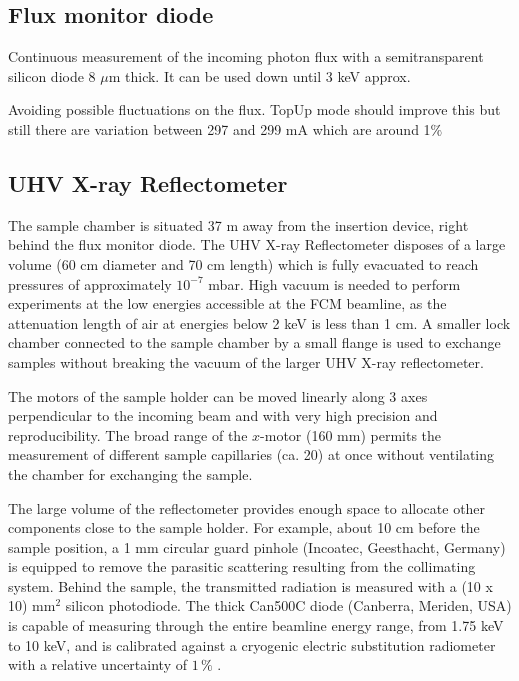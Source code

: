 \subsection{Flux monitor diode}

Continuous measurement of the incoming photon flux with a semitransparent silicon diode 8 $\mu$m thick. It can be used down until 3 keV approx.

Avoiding possible fluctuations on the flux. TopUp mode should improve this but still there are variation between 297 and 299 mA which are around 1$\%$




\subsection{UHV X-ray Reflectometer}

The sample chamber is situated 37 m away from the insertion device, right behind the flux monitor diode. The UHV X-ray Reflectometer disposes of a large volume (60 cm diameter and 70 cm length) which is fully evacuated to reach pressures of approximately $10^{-7}$ mbar. High vacuum is needed to perform experiments at the low energies accessible at the FCM beamline, as the attenuation length of air at energies below 2 keV is less than 1 cm. A smaller lock chamber connected to the sample chamber by a small flange is used to exchange samples without breaking the vacuum of the larger UHV X-ray reflectometer.

The motors of the sample holder can be moved linearly along 3 axes perpendicular to the incoming beam and with very high precision and reproducibility. The broad range of the $x$-motor (160 mm) permits the measurement of different sample capillaries (ca. 20) at once without ventilating the chamber for exchanging the sample.

The large volume of the reflectometer provides enough space to allocate other components close to the sample holder. For example, about 10 cm before the sample position, a 1 mm circular guard pinhole (Incoatec, Geesthacht, Germany) is equipped to remove the parasitic scattering resulting from the collimating system. Behind the sample, the transmitted radiation is measured with a (10 x 10) mm$^2$ silicon photodiode. The thick Can500C diode (Canberra, Meriden, USA) is capable of measuring through the entire beamline energy range, from 1.75 keV to 10 keV, and is calibrated against a cryogenic electric substitution radiometer with a relative uncertainty of \( 1\,\% \) \cite{krumrey_high-accuracy_2001}.


